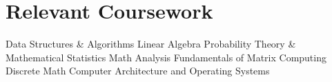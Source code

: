 \section{Relevant Coursework}
\vspace*{-1.5\multicolsep}
\begin{multicols}{4}
    \begin{itemize}[itemsep=0pt, parsep=0pt, leftmargin=*]
        \entry Data Structures \& Algorithms
        \entry Linear Algebra
        \entry Probability Theory \& Mathematical Statistics
        \entry Math Analysis
        \entry Fundamentals of Matrix Computing
        \entry Discrete Math
        \entry Computer Architecture and Operating Systems
    \end{itemize}
\end{multicols}
